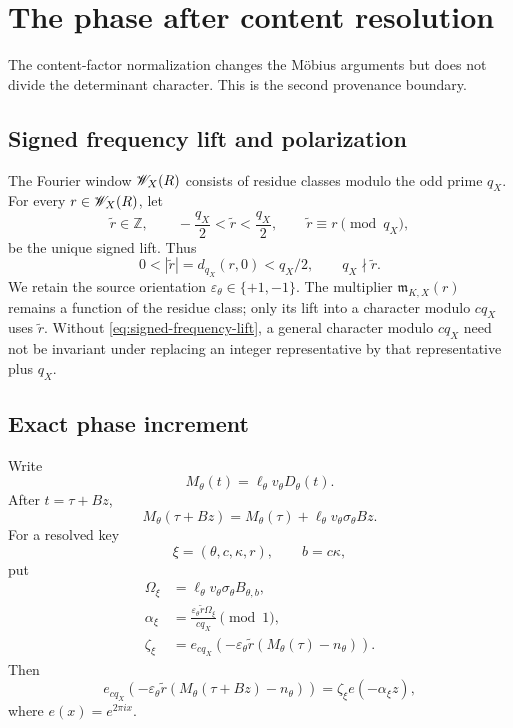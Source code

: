 \section{The phase after content resolution}
\label{sec:phase-conductor}

The content-factor normalization changes the M\"obius arguments but
does not divide the determinant character.  This is the second
provenance boundary.

\subsection{Signed frequency lift and polarization}

The Fourier window \(\mathscr W_X(R)\) consists of residue classes modulo
the odd prime \(q_X\).  For every \(r\in\mathscr W_X(R)\), let
\begin{equation}
 \widetilde r\in\mathbb Z,\qquad
 -\frac{q_X}{2}<\widetilde r<\frac{q_X}{2},
 \qquad
 \widetilde r\equiv r\pmod{q_X},
\label{eq:signed-frequency-lift}
\end{equation}
be the unique signed lift.  Thus
\[
 0<|\widetilde r|=d_{q_X}(r,0)<q_X/2,
 \qquad q_X\nmid\widetilde r.
\]
We retain the source orientation
\(\varepsilon_\theta\in\{+1,-1\}\).  The multiplier
\(\mathfrak m_{K,X}(r)\) remains a function of the residue class;
only its lift into a character modulo \(cq_X\) uses
\(\widetilde r\).  Without \eqref{eq:signed-frequency-lift}, a
general character modulo \(cq_X\) need not be invariant under
replacing an integer representative by that representative plus
\(q_X\).

\subsection{Exact phase increment}

Write
\[
 M_\theta(t)=\ell_\theta v_\theta D_\theta(t).
\]
After \(t=\tau+Bz\),
\[
 M_\theta(\tau+Bz)
 =
 M_\theta(\tau)
 +\ell_\theta v_\theta\sigma_\theta Bz.
\]
For a resolved key
\[
 \xi=(\theta,c,\kappa,r),\qquad b=c\kappa,
\]
put
\begin{align}
 \Omega_\xi
 &=
 \ell_\theta v_\theta\sigma_\theta B_{\theta,b},
\label{eq:phase-Omega}\\
 \alpha_\xi
 &=
 \frac{\varepsilon_\theta\widetilde r\Omega_\xi}{c q_X}
 \pmod 1,
\label{eq:phase-alpha}\\
 \zeta_\xi
 &=
 e_{c q_X}\!\left(
 -\varepsilon_\theta\widetilde r
 (M_\theta(\tau)-n_\theta)\right).
\label{eq:phase-zeta}
\end{align}
Then
\begin{equation}
 e_{c q_X}\!\left(
 -\varepsilon_\theta\widetilde r
 (M_\theta(\tau+Bz)-n_\theta)\right)
 =
 \zeta_\xi e(-\alpha_\xi z),
\label{eq:phase-resolved}
\end{equation}
where \(e(x)=e^{2\pi ix}\).

